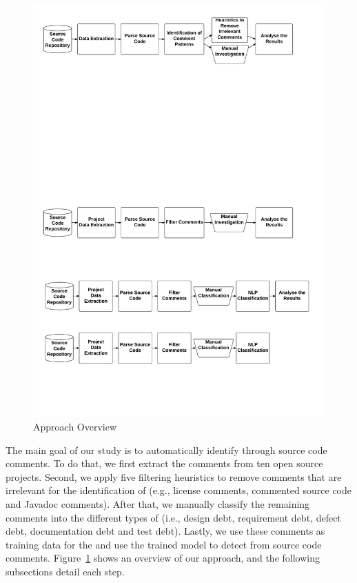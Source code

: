 \begin{figure}[thb!]
  \centering
  \includegraphics[width=1\textwidth]{figures/approach_reviwed.pdf}
  \caption{Approach Overview}
  \label{fig:approach}
  \vspace{-4mm}
\end{figure}

The main goal of our study is to automatically identify \SATD through source code comments. To do that, we first extract the comments from ten open source projects. Second, we apply five filtering heuristics to remove comments that are irrelevant for the identification of \SATD  (e.g., license comments, commented source code and Javadoc comments). After that, we manually classify the remaining comments into the different types of \SATD (i.e., design debt, requirement debt, defect debt, documentation debt and test debt). Lastly, we use these comments as training data for the  and use the trained model to detect \SATD from source code comments. Figure~\ref{fig:approach} shows an overview of our approach, and the following subsections detail each step.

